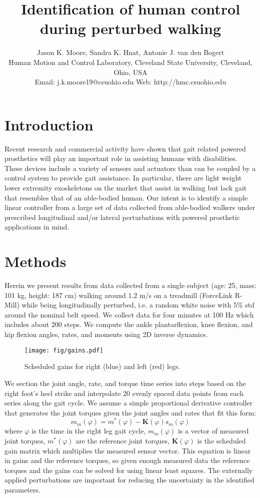 \documentclass[10pt,letterpaper,notitlepage,twocolumn]{article}
\title{\bf Identification of human control during perturbed walking}
\author{
  Jason K. Moore, Sandra K. Hnat, Antonie J. van den Bogert\\
  Human Motion and Control Laboratory, Cleveland State University, Cleveland, Ohio, USA\\
  Email: j.k.moore19@csuohio.edu Web: http://hmc.csuohio.edu
}
\date{}
\begin{document}

\maketitle

\section*{Introduction}
%
Recent research and commercial activity have shown that gait related powered
prosthetics will play an important role in assisting humans with disabilities.
These devices include a variety of sensors and actuators than can be coupled by
a control system to provide gait assistance. In particular, there are light
weight lower extremity exoskeletons on the market that assist in walking but
lack gait that resembles that of an able-bodied human. Our intent is to
identify a simple linear controller from a large set of data collected from
able-bodied walkers under prescribed longitudinal and/or lateral perturbations
with powered prosthetic applications in mind.
%
\section*{Methods}
Herein we present results from data collected from a single subject (age: 25,
mass: 101 kg, height: 187 cm) walking around 1.2 m/s on a treadmill (ForceLink
R-Mill) while being longitudinally perturbed, i.e. a random white noise with
5\% std around the nominal belt speed. We collect data for four minutes at 100
Hz which includes about 200 steps. We compute the ankle plantarflexion, knee
flexion, and hip flexion angles, rates, and moments using 2D inverse dynamics.
%
\begin{figure}[hbt]
  \begin{center}
    \texttt{[image: fig/gains.pdf]}
    \caption{Scheduled gains for right (blue) and left (red) legs.}
    \label{fig:gains}
  \end{center}
\end{figure}

We section the joint angle, rate, and torque time series into steps based on
the right foot's heel strike and interpolate 20 evenly spaced data points from
each series along the gait cycle. We assume a simple proportional derivative
controller that generates the joint torques given the joint angles and rates
that fit this form:
%
\begin{equation}
  m_m(\varphi) = m^*(\varphi) - \mathbf{K}(\varphi)s_m(\varphi)
\end{equation}
%
where $\varphi$ is the time in the right leg gait cycle, $m_m(\varphi)$ is a
vector of measured joint torques, $m^*(\varphi)$ are the reference joint
torques, $\mathbf{K}(\varphi)$ is the scheduled gain matrix which multiplies
the measured sensor vector. This equation is linear in gains and the reference
torques, so given enough measured data the reference torques and the gains can
be solved for using linear least squares. The externally applied perturbations
are important for reducing the uncertainty in the identified parameters.
\end{document}
